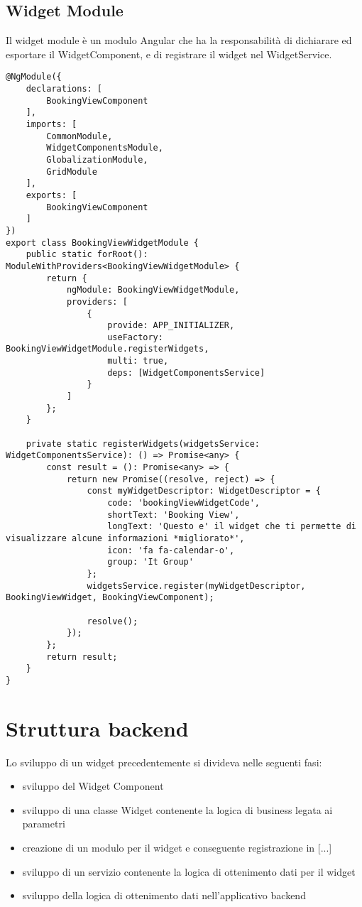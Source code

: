 \subsection{Widget Module}
Il widget module è un modulo Angular che ha la responsabilità di dichiarare ed esportare il WidgetComponent, e di registrare il widget nel WidgetService.
\begin{lstlisting}[caption={booking-view-widget.module.ts},label={booking_view_widget_module},style=javascriptCode]
@NgModule({
    declarations: [
        BookingViewComponent
    ],
    imports: [
        CommonModule,
        WidgetComponentsModule,
        GlobalizationModule,
        GridModule
    ],
    exports: [
        BookingViewComponent
    ]
})
export class BookingViewWidgetModule {
    public static forRoot(): ModuleWithProviders<BookingViewWidgetModule> {
        return {
            ngModule: BookingViewWidgetModule,
            providers: [
                {
                    provide: APP_INITIALIZER,
                    useFactory: BookingViewWidgetModule.registerWidgets,
                    multi: true,
                    deps: [WidgetComponentsService]
                }
            ]
        };
    }

    private static registerWidgets(widgetsService: WidgetComponentsService): () => Promise<any> {
        const result = (): Promise<any> => {
            return new Promise((resolve, reject) => {
                const myWidgetDescriptor: WidgetDescriptor = {
                    code: 'bookingViewWidgetCode',
                    shortText: 'Booking View',
                    longText: 'Questo e' il widget che ti permette di visualizzare alcune informazioni *migliorato*',
                    icon: 'fa fa-calendar-o',
                    group: 'It Group'
                };
                widgetsService.register(myWidgetDescriptor, BookingViewWidget, BookingViewComponent);

                resolve();
            });
        };
        return result;
    }
}
\end{lstlisting}

\section{Struttura backend}
Lo sviluppo di un widget precedentemente si divideva nelle seguenti fasi:
\begin{itemize}
\item sviluppo del Widget Component
\item sviluppo di una classe Widget contenente la logica di business legata ai parametri
\item creazione di un modulo per il widget e conseguente registrazione in [...]
\item sviluppo di un servizio contenente la logica di ottenimento dati per il widget
\item sviluppo della logica di ottenimento dati nell'applicativo backend
\end{itemize}
